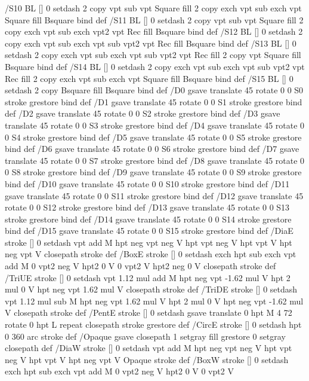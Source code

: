 {{/S10 {BL [] 0 setdash 2 copy vpt sub vpt Square fill 2 copy exch vpt sub exch vpt Square fill
	Bsquare} bind def
/S11 {BL [] 0 setdash 2 copy vpt sub vpt Square fill 2 copy exch vpt sub exch vpt2 vpt Rec fill
	Bsquare} bind def
/S12 {BL [] 0 setdash 2 copy exch vpt sub exch vpt sub vpt2 vpt Rec fill Bsquare} bind def
/S13 {BL [] 0 setdash 2 copy exch vpt sub exch vpt sub vpt2 vpt Rec fill
	2 copy vpt Square fill Bsquare} bind def
/S14 {BL [] 0 setdash 2 copy exch vpt sub exch vpt sub vpt2 vpt Rec fill
	2 copy exch vpt sub exch vpt Square fill Bsquare} bind def
/S15 {BL [] 0 setdash 2 copy Bsquare fill Bsquare} bind def
/D0 {gsave translate 45 rotate 0 0 S0 stroke grestore} bind def
/D1 {gsave translate 45 rotate 0 0 S1 stroke grestore} bind def
/D2 {gsave translate 45 rotate 0 0 S2 stroke grestore} bind def
/D3 {gsave translate 45 rotate 0 0 S3 stroke grestore} bind def
/D4 {gsave translate 45 rotate 0 0 S4 stroke grestore} bind def
/D5 {gsave translate 45 rotate 0 0 S5 stroke grestore} bind def
/D6 {gsave translate 45 rotate 0 0 S6 stroke grestore} bind def
/D7 {gsave translate 45 rotate 0 0 S7 stroke grestore} bind def
/D8 {gsave translate 45 rotate 0 0 S8 stroke grestore} bind def
/D9 {gsave translate 45 rotate 0 0 S9 stroke grestore} bind def
/D10 {gsave translate 45 rotate 0 0 S10 stroke grestore} bind def
/D11 {gsave translate 45 rotate 0 0 S11 stroke grestore} bind def
/D12 {gsave translate 45 rotate 0 0 S12 stroke grestore} bind def
/D13 {gsave translate 45 rotate 0 0 S13 stroke grestore} bind def
/D14 {gsave translate 45 rotate 0 0 S14 stroke grestore} bind def
/D15 {gsave translate 45 rotate 0 0 S15 stroke grestore} bind def
/DiaE {stroke [] 0 setdash vpt add M
  hpt neg vpt neg V hpt vpt neg V
  hpt vpt V hpt neg vpt V closepath stroke} def
/BoxE {stroke [] 0 setdash exch hpt sub exch vpt add M
  0 vpt2 neg V hpt2 0 V 0 vpt2 V
  hpt2 neg 0 V closepath stroke} def
/TriUE {stroke [] 0 setdash vpt 1.12 mul add M
  hpt neg vpt -1.62 mul V
  hpt 2 mul 0 V
  hpt neg vpt 1.62 mul V closepath stroke} def
/TriDE {stroke [] 0 setdash vpt 1.12 mul sub M
  hpt neg vpt 1.62 mul V
  hpt 2 mul 0 V
  hpt neg vpt -1.62 mul V closepath stroke} def
/PentE {stroke [] 0 setdash gsave
  translate 0 hpt M 4 {72 rotate 0 hpt L} repeat
  closepath stroke grestore} def
/CircE {stroke [] 0 setdash 
  hpt 0 360 arc stroke} def
/Opaque {gsave closepath 1 setgray fill grestore 0 setgray closepath} def
/DiaW {stroke [] 0 setdash vpt add M
  hpt neg vpt neg V hpt vpt neg V
  hpt vpt V hpt neg vpt V Opaque stroke} def
/BoxW {stroke [] 0 setdash exch hpt sub exch vpt add M
  0 vpt2 neg V hpt2 0 V 0 vpt2 V
}}}
